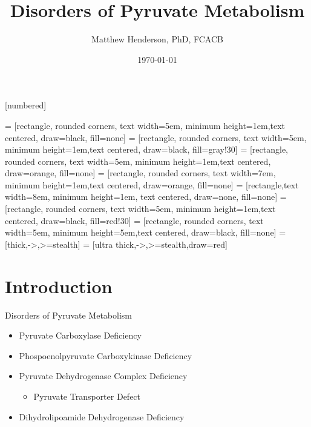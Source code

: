 \documentclass[presentation, smaller]{beamer}
\author{Matthew Henderson, PhD, FCACB}
\date{\today}
\title{Disorders of Pyruvate Metabolism}
\institute[NSO]{Newborn Screening Ontario | The University of Ottawa}
\begin{document}
\maketitle


\vspace{220pt}
\beamertemplatenavigationsymbolsempty
{}[numbered]

 = [rectangle, rounded corners, text width=5em, minimum height=1em,text centered, draw=black, fill=none]
 = [rectangle, rounded corners, text width=5em, minimum height=1em,text centered, draw=black, fill=gray!30]
 = [rectangle, rounded corners, text width=5em, minimum height=1em,text centered, draw=orange, fill=none]
 = [rectangle, rounded corners, text width=7em, minimum height=1em,text centered, draw=orange, fill=none]
 = [rectangle,text width=8em, minimum height=1em, text centered, draw=none, fill=none]
 = [rectangle, rounded corners, text width=5em, minimum height=1em,text centered, draw=black, fill=red!30]
 = [rectangle, rounded corners, text width=5em, minimum height=5em,text centered, draw=black, fill=none]
 = [thick,->,>=stealth]
 = [ultra thick,->,>=stealth,draw=red]

\section{Introduction}
\label{sec:org8b07d69}
\begin{frame}[label={sec:orge4ce3d4}]{Disorders of Pyruvate Metabolism}
\begin{itemize}
\item Pyruvate Carboxylase Deficiency
\item Phospoenolpyruvate Carboxykinase Deficiency
\item Pyruvate Dehydrogenase Complex Deficiency
\begin{itemize}
\item Pyruvate Transporter Defect
\end{itemize}
\item Dihydrolipoamide Dehydrogenase Deficiency
\end{itemize}
\end{frame}
\end{document}
